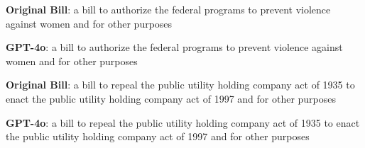 \begin{tcolorbox}[colback=white,colframe=black!75!white] 
    \begin{minipage}{0.475\textwidth}
    \centering
    \begin{tcolorbox}[colback=black!5!white,colframe=black!75!white, fontupper=\small, fontlower=\small] 
    \textbf{Original Bill}: a bill to authorize the federal programs to prevent violence against women and for other purposes
    \end{tcolorbox}
    \end{minipage} 
    \hfill
    \begin{minipage}{0.475\textwidth}
    \centering
    \begin{tcolorbox}[colback=black!5!white,colframe=black!75!white, fontupper=\small, fontlower=\small] 
    \textbf{GPT-4o}: a bill to authorize the federal programs to prevent violence against women and for other purposes
    \end{tcolorbox}
    \end{minipage}
\end{tcolorbox}
\begin{tcolorbox}[colback=white,colframe=black!75!white] 
    \begin{minipage}{0.475\textwidth}
    \centering
    \begin{tcolorbox}[colback=black!5!white,colframe=black!75!white, fontupper=\small, fontlower=\small] 
    \textbf{Original Bill}: a bill to repeal the public utility holding company act of 1935 to enact the public utility holding company act of 1997 and for other purposes
    \end{tcolorbox}
    \end{minipage} 
    \hfill
    \begin{minipage}{0.475\textwidth}
    \centering
    \begin{tcolorbox}[colback=black!5!white,colframe=black!75!white, fontupper=\small, fontlower=\small] 
    \textbf{GPT-4o}: a bill to repeal the public utility holding company act of 1935 to enact the public utility holding company act of 1997 and for other purposes
    \end{tcolorbox}
    \end{minipage}
\end{tcolorbox}